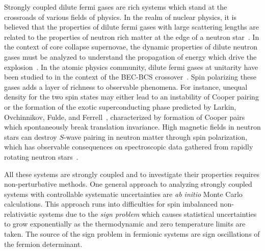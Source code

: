 \documentclass[aps,eqsecnum,amsmath,onecolumn,groupedaddress,superscriptaddress,notitlepage,nofootinbib]{revtex4-1}
\begin{document}
Strongly coupled dilute fermi gases are rich systems which stand at the crossroads of various fields of physics. In the realm of nuclear physics, it is believed that the properties of dilute fermi gases with large scattering lengths are related to the properties of neutron rich matter at the edge of a neutron star~\cite{2003AIPC..690..184C}. In the context of core collapse supernovae, the dynamic properties of dilute neutron gases must be analyzed to understand the propagation of energy which drive the explosion~\cite{Burrows:2004vq,Bedaque:2018wns}. In the atomic physics community, dilute fermi gases at unitarity have been studied to in the context of the BEC-BCS crossover~\cite{Zwerger:2012}. Spin polarizing these gases adds a layer of richness to observable phenomena. For instance, unequal density for the two spin states may either lead to an instability of Cooper pairing \cite{Bedaque:2003hi} or the formation of the exotic superconducting phase predicted by Larkin, Ovchinnikov, Fulde, and Ferrell~\cite{PhysRev.135.A550,Larkin:1965}, characterized by formation of Cooper pairs which spontaneously break translation invariance. High magnetic fields in neutron stars can destroy $S$-wave pairing in neutron matter through spin polarization, which has observable consequences on spectroscopic data gathered from rapidly rotating neutron stars~\cite{PhysRevC.93.015802}. 

All these systems are strongly coupled and to investigate their properties requires non-perturbative methods. One general approach to analyzing strongly coupled systems with controllable systematic uncertainties are \emph{ab initio} Monte Carlo calculations. This approach runs into difficulties for spin imbalanced non-relativistic systems due to the \emph{sign problem} which causes statistical uncertainties to grow exponentially as the thermodynamic and zero temperature limits are taken. The source of the sign problem in fermionic systems are sign oscillations of the fermion determinant. 
\end{document}
